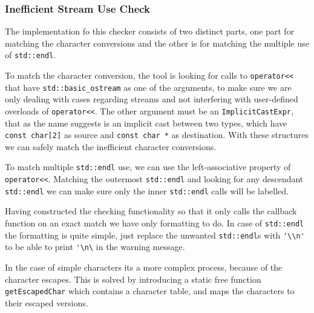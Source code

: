 \subsubsection{Inefficient Stream Use Check}
\par The implementation fo this checker consists of two distinct parts, one part for matching the character conversions and the other is for matching the multiple use of \verb|std::endl|. \medskip
\par To match the character conversion, the tool is looking for calls to \verb|operator<<| that have \verb|std::basic_ostream| as one of the arguments, to make sure we are only dealing with cases regarding streams and not interfering with user-defined overloads of \verb|operator<<|. The other argument must be an \verb|ImplicitCastExpr|, that as the name suggests is an implicit cast between two types, which have \verb|const char[2]| as source and \verb|const char *| as destination. With these structures we can safely match the inefficient character conversions. \medskip
\par To match multiple \verb|std::endl| use, we can use the left-associative property of \verb|operator<<|. Matching the outermost \verb|std::endl| and looking for any descendant \verb|std::endl| we can make sure only the inner \verb|std::endl| calls will be labelled. \medskip
\par Having constructed the checking functionality so that it only calls the callback function on an exact match we have only formatting to do. In case of \verb|std::endl| the formatting is quite simple, just replace the unwanted \verb|std::endl|s with \verb|'\\n'| to be able to print \verb|'\n\| in the warning message. \medskip
\par In the case of simple characters its a more complex process, because of the character escapes. This is solved by introducing a static free function \verb|getEscapedChar| which contains a character table, and maps the characters to their escaped versions. 
